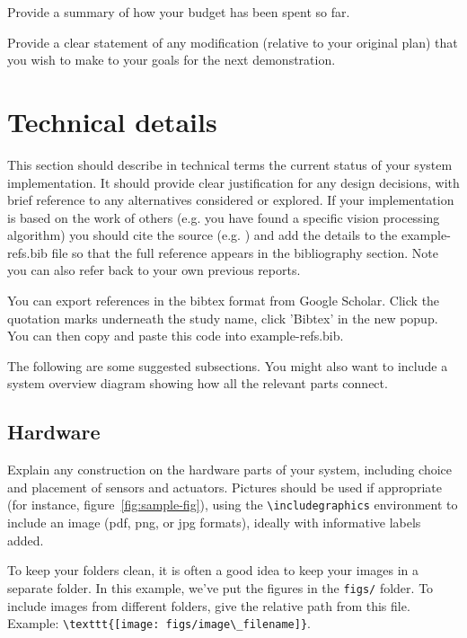 \documentclass{article}
\begin{document}
Provide a summary of how your budget has been spent so far.

Provide a clear statement of any modification (relative to your original plan) that you wish to make to your goals for the next demonstration.

\section{Technical details}

This section should describe in technical terms the current status of your system implementation. It should provide clear justification for any design decisions, with brief reference to any alternatives considered or explored. If your implementation is based on the work of others (e.g. you have found a specific vision processing algorithm) you should cite the source (e.g. \cite{Newell81}) and add the details to the example-refs.bib file so that the full reference appears in the bibliography section. Note you can also refer back to your own previous reports. 

You can export references in the bibtex format from Google Scholar. Click the quotation marks underneath the study name, click 'Bibtex' in the new popup. You can then copy and paste this code into example-refs.bib.

The following are some suggested subsections. You might also want to include a system overview diagram showing how all the relevant parts connect. 

\subsection{Hardware}

Explain any construction on the hardware parts of your system, including choice and placement of sensors and actuators. Pictures should be used if appropriate (for instance, figure~\ref{fig:sample-fig}), using the \verb+\includegraphics+ environment to include an image (pdf, png, or jpg formats), ideally with informative labels added. 

To keep your folders clean, it is often a good idea to keep your images in a separate folder. In this example, we've put the figures in the \texttt{figs/} folder. To include images from different folders, give the relative path from this file. Example: \verb+\texttt{[image: figs/image\_filename]}+.
\end{document}
